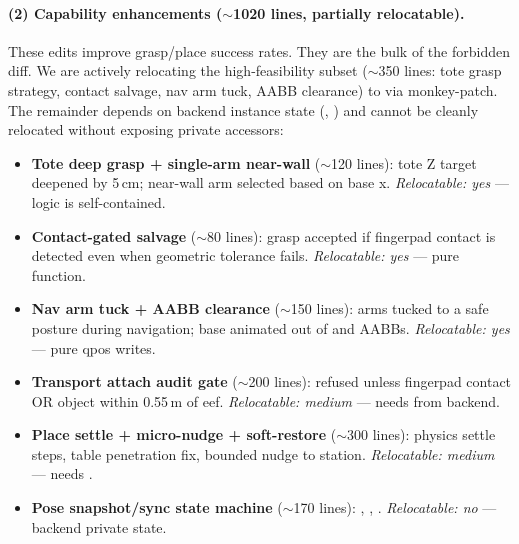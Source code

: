 \paragraph{(2) Capability enhancements ($\sim$1020 lines, partially relocatable).}
These edits improve grasp/place success rates.  They are the bulk of the
forbidden diff.  We are actively relocating the high-feasibility subset
($\sim$350 lines: tote grasp strategy, contact salvage, nav arm tuck, AABB
clearance) to  via monkey-patch.  The
remainder depends on backend instance state (,
) and cannot be cleanly relocated without
exposing private accessors:
\begin{itemize}[leftmargin=*,itemsep=2pt]
    \item \textbf{Tote deep grasp + single-arm near-wall} ($\sim$120 lines):
    tote Z target deepened by 5\,cm; near-wall arm selected based on base x.
    \emph{Relocatable: yes} --- logic is self-contained.
    \item \textbf{Contact-gated salvage} ($\sim$80 lines): grasp accepted if
    fingerpad contact is detected even when geometric tolerance fails.
    \emph{Relocatable: yes} --- pure function.
    \item \textbf{Nav arm tuck + AABB clearance} ($\sim$150 lines): arms tucked
    to a safe posture during navigation; base animated out of
     and  AABBs.
    \emph{Relocatable: yes} --- pure qpos writes.
    \item \textbf{Transport attach audit gate} ($\sim$200 lines):
     refused unless fingerpad contact OR
    object within 0.55\,m of eef.  \emph{Relocatable: medium} --- needs
     from backend.
    \item \textbf{Place settle + micro-nudge + soft-restore} ($\sim$300 lines):
    physics settle steps, table penetration fix, bounded nudge to station.
    \emph{Relocatable: medium} --- needs .
    \item \textbf{Pose snapshot/sync state machine} ($\sim$170 lines):
    ,
    ,
    .  \emph{Relocatable: no} ---
    backend private state.
\end{itemize}

